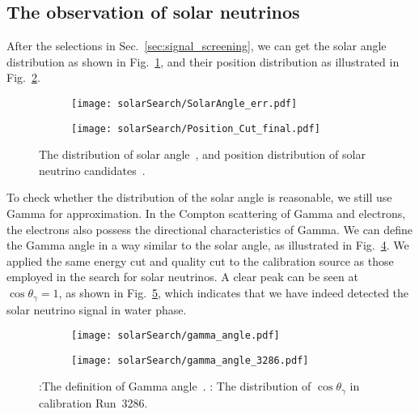 \subsection{The observation of solar neutrinos}
After the selections in Sec.~\ref{sec:signal_screening}, we can get the solar angle distribution as shown in Fig.~\ref{fig:solar_angle}, and their position distribution as illustrated in Fig.~\ref{fig:solar_pos}.
\begin{figure}[htbp]
	\centering
	\begin{subfigure}{0.5\textwidth}
		\centering
		\texttt{[image: solarSearch/SolarAngle\_err.pdf]}
		\caption{}
		\label{fig:solar_angle}
	\end{subfigure}%
	\begin{subfigure}{0.5\textwidth}
		\centering
		\texttt{[image: solarSearch/Position\_Cut\_final.pdf]}
		\caption{}
		\label{fig:solar_pos}
	\end{subfigure}
	\caption{The distribution of solar angle~,  and position distribution of solar neutrino candidates~.}
	\label{fig:solar_final_distribution}
\end{figure}

To check whether the distribution of the solar angle is reasonable, we still use Gamma for approximation. In the Compton scattering of Gamma and electrons, the electrons also possess the directional characteristics of Gamma. We can define the Gamma angle in a way similar to the solar angle, as illustrated in Fig.~\ref{fig:solar_gamma_angle}. We applied the same energy cut and quality cut to the calibration source as those employed in the search for solar neutrinos. A clear peak can be seen at $\cos\theta_{\gamma}=1$, as shown in Fig.~\ref{fig:solar_gamma_dis}, which indicates that we have indeed detected the solar neutrino signal in water phase.

\begin{figure}[htbp]
	\centering
	\begin{subfigure}{0.5\textwidth}
		\centering
		\texttt{[image: solarSearch/gamma\_angle.pdf]}
		\caption{}
		\label{fig:solar_gamma_angle}
	\end{subfigure}%
	\begin{subfigure}{0.5\textwidth}
		\centering
		\texttt{[image: solarSearch/gamma\_angle\_3286.pdf]}
		\caption{}
		\label{fig:solar_gamma_dis}
	\end{subfigure}
	\caption{:The definition of Gamma angle~. : The distribution of $\cos\theta_{\gamma}$ in calibration Run~3286.}
	\label{fig:solar_final_gamma_angle}
\end{figure}

